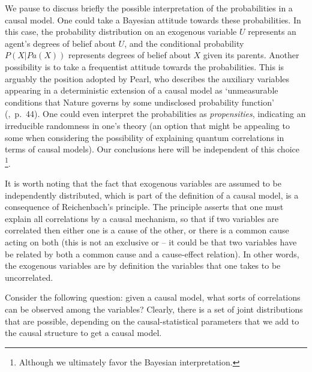 \documentclass[letterpaper,onecolumn,nofootinbib]{revtex4}
\begin{document}
We pause to discuss briefly the possible interpretation of the probabilities in a causal model.
One could take a Bayesian attitude towards these probabilities.  In this case, the probability distribution on an exogenous variable $U$ represents an agent's degrees of belief about $U$, and the conditional probability $P(X|Pa(X))$ represents degrees of belief about $X$ given its parents.  Another possibility is to take a frequentist attitude towards the probabilities. This is arguably the position adopted by Pearl, who describes the auxiliary variables appearing in a deterministic extension of a causal model as `unmeasurable conditions that Nature governs by some undisclosed probability function' (\cite{Pearl2009},~p.~44).  One could even interpret the probabilities as \emph{propensities}, indicating an irreducible randomness in one's theory (an option that might be appealing to some when considering the possibility of explaining quantum correlations in terms of causal models).  Our conclusions here will be independent of this choice \footnote{Although we ultimately favor the Bayesian interpretation.}.



It is worth noting that the fact that exogenous variables are assumed to be independently distributed, which is part of the definition of a causal model, is a consequence of Reichenbach's principle.
The principle asserts that one must explain
all correlations by a causal mechanism, so that if two variables are correlated then either one is a cause of the other, or there is a common cause acting on both (this is not an exclusive or -- it could be that two variables have be related by both a common cause and a cause-effect relation).
In other words, the exogenous variables are by definition the variables that one takes to be uncorrelated. 

Consider the following question: given a causal model, what sorts of
correlations can be observed among the variables?  Clearly, there is a set of
joint distributions that are possible, depending on the causal-statistical parameters that we
add to the causal structure to get a causal model.
\end{document}
